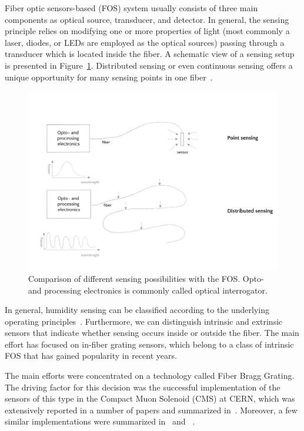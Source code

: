 Fiber optic sensors-based (\gls{FOS}) system usually consists of three main components as optical source, transducer, and detector. In general, the sensing principle relies on modifying one or more properties of light (most commonly a laser, diodes, or LEDs are employed as the optical sources) passing through a transducer which is located inside the fiber. A schematic view of a sensing setup is presented in Figure~\ref{fig:sensing}. Distributed sensing or even continuous sensing offers a unique opportunity for many sensing points in one fiber~\cite{GRATTAN200040}. 
\newpage
\begin{figure}[!h]
\centering
\includegraphics[width=0.95\columnwidth]{Chapter5/images/sensing.png}
\caption{Comparison of different sensing possibilities with the \gls{FOS}. Opto- and processing electronics is commonly called optical interrogator.}
\label{fig:sensing}
\end{figure}

In general, humidity sensing can be classified according to the underlying operating principles~\cite{fos_overview}. Furthermore, we can distinguish intrinsic and extrinsic sensors that indicate whether sensing occurs inside or outside the fiber. The main effort has focused on in-fiber grating sensors, which belong to a class of intrinsic \gls{FOS} that has gained popularity in recent years. 

The main efforts were concentrated on a technology called Fiber Bragg Grating. The driving factor for this decision was the successful implementation of the sensors of this type in the Compact Muon Solenoid (\gls{CMS}) at \gls{CERN}, which was extensively reported in a number of papers and summarized in~\cite{Berruti}. Moreover, a few similar implementations were summarized in~\cite{YEO_PI} and ~\cite{Kronenberg:02}. 

